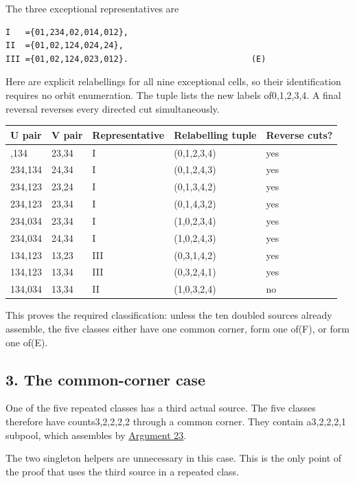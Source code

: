 \documentclass[
  10pt,
]{article}
\begin{document}
The three exceptional representatives are

\begin{verbatim}
I   ={01,234,02,014,012},
II  ={01,02,124,024,24},
III ={01,02,124,023,012}.                         (E)
\end{verbatim}

Here are explicit relabellings for all nine exceptional cells, so their
identification requires no orbit enumeration. The tuple lists the new
labels of0,1,2,3,4. A final reversal reverses every directed cut
simultaneously.

\begin{longtable}[]{@{}lllll@{}}
\toprule\noalign{}
U pair & V pair & Representative & Relabelling tuple & Reverse cuts? \\
\midrule\noalign{}
\endhead
\bottomrule\noalign{}
\endlastfoot
234,134 & 23,34 & I & (0,1,2,3,4) & yes \\
234,134 & 24,34 & I & (0,1,2,4,3) & yes \\
234,123 & 23,24 & I & (0,1,3,4,2) & yes \\
234,123 & 23,34 & I & (0,1,4,3,2) & yes \\
234,034 & 23,34 & I & (1,0,2,3,4) & yes \\
234,034 & 24,34 & I & (1,0,2,4,3) & yes \\
134,123 & 13,23 & III & (0,3,1,4,2) & yes \\
134,123 & 13,34 & III & (0,3,2,4,1) & yes \\
134,034 & 13,34 & II & (1,0,3,2,4) & no \\
\end{longtable}

This proves the required classification: unless the ten doubled sources
already assemble, the five classes either have one common corner, form
one of(F), or form one of(E).

\hypertarget{the-common-corner-case}{%
\subsection*{3. The common-corner case}\label{the-common-corner-case}}

One of the five repeated classes has a third actual source. The five
classes therefore have counts3,2,2,2,2 through a common corner. They
contain a3,2,2,2,1 subpool, which assembles by
\protect\hyperlink{arg-23}{Argument 23}.

The two singleton helpers are unnecessary in this case. This is the only
point of the proof that uses the third source in a repeated class.
\end{document}
